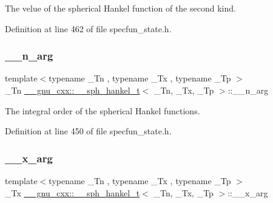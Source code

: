 The velue of the spherical Hankel function of the second kind. 



Definition at line 462 of file specfun\+\_\+state.\+h.

\mbox{\label{struct____gnu__cxx_1_1____sph__hankel__t_a43f671e87375a9077262676564df20c5}} 
\subsubsection{\texorpdfstring{\+\_\+\+\_\+n\+\_\+arg}{\_\_n\_arg}}
{\footnotesize\ttfamily template$<$typename \+\_\+\+Tn , typename \+\_\+\+Tx , typename \+\_\+\+Tp $>$ \\
\+\_\+\+Tn \hyperlink{struct____gnu__cxx_1_1____sph__hankel__t}{\+\_\+\+\_\+gnu\+\_\+cxx\+::\+\_\+\+\_\+sph\+\_\+hankel\+\_\+t}$<$ \+\_\+\+Tn, \+\_\+\+Tx, \+\_\+\+Tp $>$\+::\+\_\+\+\_\+n\+\_\+arg}



The integral order of the spherical Hankel functions. 



Definition at line 450 of file specfun\+\_\+state.\+h.

\mbox{\label{struct____gnu__cxx_1_1____sph__hankel__t_a265ee0cdcca2d491c29b520a0fd4e4b3}} 
\subsubsection{\texorpdfstring{\+\_\+\+\_\+x\+\_\+arg}{\_\_x\_arg}}
{\footnotesize\ttfamily template$<$typename \+\_\+\+Tn , typename \+\_\+\+Tx , typename \+\_\+\+Tp $>$ \\
\+\_\+\+Tx \hyperlink{struct____gnu__cxx_1_1____sph__hankel__t}{\+\_\+\+\_\+gnu\+\_\+cxx\+::\+\_\+\+\_\+sph\+\_\+hankel\+\_\+t}$<$ \+\_\+\+Tn, \+\_\+\+Tx, \+\_\+\+Tp $>$\+::\+\_\+\+\_\+x\+\_\+arg}



